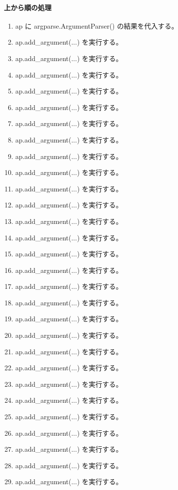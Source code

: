 \documentclass[a4paper,11pt]{article}
\begin{document}
            \paragraph{上から順の処理}
            \begin{enumerate}[leftmargin=1.8em]
            \item ap に argparse.ArgumentParser() の結果を代入する。
\item ap.add\_argument(...) を実行する。
\item ap.add\_argument(...) を実行する。
\item ap.add\_argument(...) を実行する。
\item ap.add\_argument(...) を実行する。
\item ap.add\_argument(...) を実行する。
\item ap.add\_argument(...) を実行する。
\item ap.add\_argument(...) を実行する。
\item ap.add\_argument(...) を実行する。
\item ap.add\_argument(...) を実行する。
\item ap.add\_argument(...) を実行する。
\item ap.add\_argument(...) を実行する。
\item ap.add\_argument(...) を実行する。
\item ap.add\_argument(...) を実行する。
\item ap.add\_argument(...) を実行する。
\item ap.add\_argument(...) を実行する。
\item ap.add\_argument(...) を実行する。
\item ap.add\_argument(...) を実行する。
\item ap.add\_argument(...) を実行する。
\item ap.add\_argument(...) を実行する。
\item ap.add\_argument(...) を実行する。
\item ap.add\_argument(...) を実行する。
\item ap.add\_argument(...) を実行する。
\item ap.add\_argument(...) を実行する。
\item ap.add\_argument(...) を実行する。
\item ap.add\_argument(...) を実行する。
\item ap.add\_argument(...) を実行する。
\item ap.add\_argument(...) を実行する。
\item ap.add\_argument(...) を実行する。

\end{enumerate}
\end{document}
